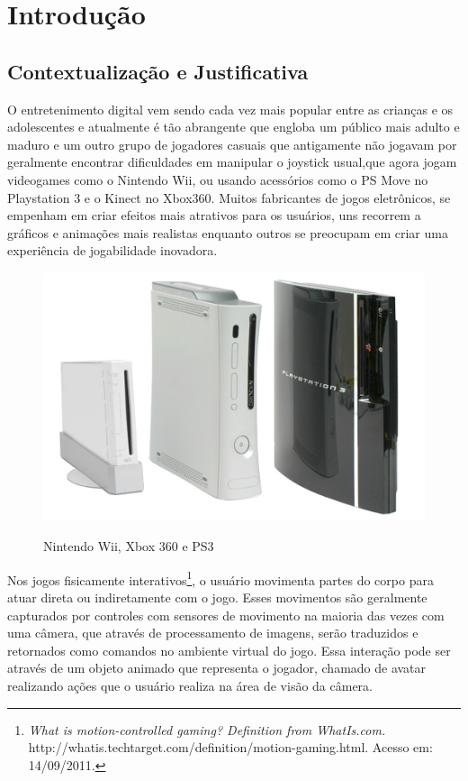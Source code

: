 \chapter{Introdução}

\section{Contextualização e Justificativa}

O entretenimento digital vem sendo cada vez mais popular entre as crianças e os adolescentes e atualmente é tão abrangente que engloba um público mais adulto e maduro
e um outro grupo de jogadores casuais que antigamente não jogavam por geralmente encontrar dificuldades em manipular o joystick usual,que agora jogam videogames como
o Nintendo Wii, ou usando acessórios como o PS Move no Playstation 3 e o Kinect no Xbox360. Muitos fabricantes de jogos eletrônicos, se empenham em criar efeitos mais atrativos para os
usuários, uns recorrem a gráficos e animações mais realistas enquanto outros se preocupam em criar  uma experiência de jogabilidade inovadora.\cite{WiiWillRockYou}

\begin{figure}[h]
    \center
    \includegraphics[scale=0.40]{imagens/os3consoles.jpg}
    \label{os3consoles}
    \caption{Nintendo Wii, Xbox 360 e PS3}
\end{figure}

Nos jogos fisicamente interativos\footnote{\textit{What is motion-controlled gaming? Definition from WhatIs.com.}
http://whatis.techtarget.com/definition/motion-gaming.html. Acesso  em: 14/09/2011.}, o usuário movimenta partes do corpo para atuar direta ou indiretamente com
o jogo. Esses movimentos são geralmente capturados por controles com sensores de movimento na maioria das vezes com uma câmera, que através de processamento de
imagens, serão traduzidos e retornados como comandos no ambiente virtual do jogo. Essa interação pode ser através de um objeto animado que representa o jogador,
chamado de avatar realizando ações que o usuário realiza na área de visão da câmera.

